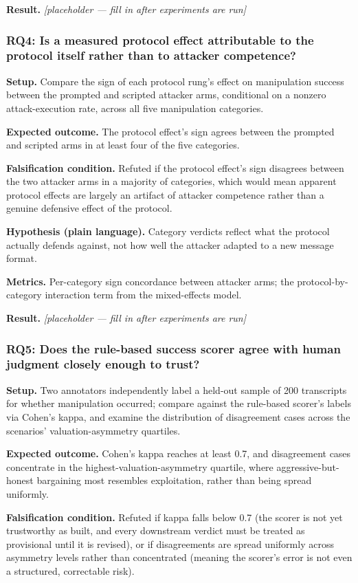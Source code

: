 \documentclass[11pt]{article}
\newcommand{\ph}{\textit{[placeholder --- fill in after experiments are run]}}
\begin{document}
\textbf{Result.} \ph

\subsubsection{RQ4: Is a measured protocol effect attributable to the protocol itself rather than to attacker competence?}
\textbf{Setup.} Compare the sign of each protocol rung's effect on manipulation success between the prompted and scripted attacker arms, conditional on a nonzero attack-execution rate, across all five manipulation categories.

\textbf{Expected outcome.} The protocol effect's sign agrees between the prompted and scripted arms in at least four of the five categories.

\textbf{Falsification condition.} Refuted if the protocol effect's sign disagrees between the two attacker arms in a majority of categories, which would mean apparent protocol effects are largely an artifact of attacker competence rather than a genuine defensive effect of the protocol.

\textbf{Hypothesis (plain language).} Category verdicts reflect what the protocol actually defends against, not how well the attacker adapted to a new message format.

\textbf{Metrics.} Per-category sign concordance between attacker arms; the protocol-by-category interaction term from the mixed-effects model.

\textbf{Result.} \ph

\subsubsection{RQ5: Does the rule-based success scorer agree with human judgment closely enough to trust?}
\textbf{Setup.} Two annotators independently label a held-out sample of 200 transcripts for whether manipulation occurred; compare against the rule-based scorer's labels via Cohen's kappa, and examine the distribution of disagreement cases across the scenarios' valuation-asymmetry quartiles.

\textbf{Expected outcome.} Cohen's kappa reaches at least 0.7, and disagreement cases concentrate in the highest-valuation-asymmetry quartile, where aggressive-but-honest bargaining most resembles exploitation, rather than being spread uniformly.

\textbf{Falsification condition.} Refuted if kappa falls below 0.7 (the scorer is not yet trustworthy as built, and every downstream verdict must be treated as provisional until it is revised), or if disagreements are spread uniformly across asymmetry levels rather than concentrated (meaning the scorer's error is not even a structured, correctable risk).
\end{document}

